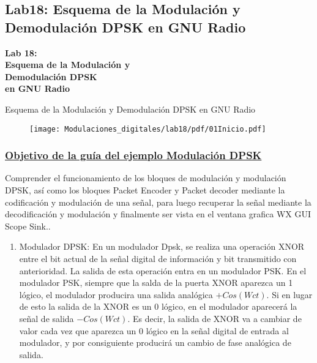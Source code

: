 \subsection{Lab18: Esquema de la Modulación y Demodulación DPSK en GNU Radio}
\begin{frame}{}


\bfseries{\textrm{ \Large Lab 18: \\Esquema de la Modulación y \\Demodulación DPSK \\en GNU Radio}}
\raggedright
\end{frame}

\begin{frame}{Esquema de la Modulación y Demodulación DPSK en GNU Radio}


\begin{figure}[H]
	\vspace{-3mm}
	\centering
	\texttt{[image: Modulaciones\_digitales/lab18/pdf/01Inicio.pdf]}
\end{figure}
\end{frame}

	\begin{frame}
	\frametitle{\underline{\textbf{Objetivo de la guía del ejemplo Modulación DPSK}}}	
	Comprender el funcionamiento de los bloques de modulación y modulación DPSK, así como los bloques Packet Encoder y Packet decoder mediante la codificación y modulación de una señal, para luego recuperar la señal mediante la decodificación y modulación y finalmente ser vista en el ventana grafica WX GUI Scope Sink..\vspace{2mm}
	\end{frame}

	\begin{frame}
	\begin{enumerate}[1.]
	\frametitle{\underline{\textbf{Guía Ejemplo Modulación DPSK}}}
	\item{Modulador DPSK: En un modulador Dpsk, se realiza una operación XNOR entre el bit actual de la señal digital de información y bit transmitido con anterioridad. La salida de esta operación entra en un modulador PSK. En el modulador PSK, siempre que la salda de la puerta XNOR aparezca un 1 lógico, el modulador producira una salida analógica $+Cos(Wct)$. Si en lugar de esto la salida de la XNOR es un 0 lógico, en el modulador aparecerá la señal de salida $-Cos(Wct)$. Es decir, la salida de XNOR va a cambiar de valor cada vez que aparezca un 0 lógico en la señal digital de entrada al modulador, y por consiguiente producirá un cambio de fase analógica de salida.}\\

	\end{enumerate}
	\end{frame}	
	
